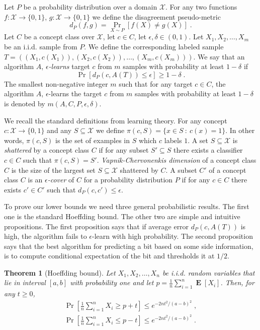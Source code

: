 \documentclass[11pt]{article}
\newtheorem{theorem}[proposition]{Theorem}
\newcommand{\X}{\mathcal{X}}
\DeclareMathOperator{\Exp}{\mathbf{E}}
\begin{document}
Let $P$ be a probability distribution over a domain $\X$. For any two functions
$f:\X \to \{0,1\}$, $g:\X \to \{0,1\}$ we define the disagreement pseudo-metric
$$
d_P(f,g) = \Pr_{X \sim P}[f(X) \neq g(X)] \; .
$$
Let $C$ be a concept class over $\X$, let $c \in C$, let $\epsilon, \delta \in (0,1)$.
Let  $X_1, X_2, \dots, X_m$ be an i.i.d. sample from $P$. We define the corresponding
labeled sample $T = ((X_1, c(X_1)), (X_2, c(X_2)), \dots, (X_m, c(X_m)))$.
We say that an algorithm $A$, \emph{$\epsilon$-learns} target $c$ from $m$ samples
with probability at least $1 - \delta$ if
$$
\Pr \left[d_P(c,A(T)) \le \epsilon \right]  \ge 1 - \delta \; .
$$
The smallest non-negative integer $m$ such that for any target $c \in C$,
the algorithm $A$, $\epsilon$-learns the target $c$ from $m$ samples
with probability at least $1-\delta$ is denoted by $m(A,C,P,\epsilon,\delta)$.

We recall the standard definitions from learning theory. For any concept $c:\X
\to \{0,1\}$ and any $S \subseteq \X$ we define $\pi(c,S) = \{x \in S ~:~ c(x) =
1 \}$. In other words, $\pi(c,S)$ is the set of examples in $S$ which $c$ labels
$1$. A set $S \subseteq \X$ is \emph{shattered} by a concept class $C$ if for
any subset $S' \subseteq S$ there exists a classifier $c \in C$ such that
$\pi(c,S) = S'$. \emph{Vapnik-Chervonenkis dimension} of a concept class $C$ is
the size of the largest set $S \subseteq \X$ shattered by $C$. A subset $C'$ of
a concept class $C$ is an \emph{$\epsilon$-cover} of $C$ for a probability
distribution $P$ if for any $c \in C$ there exists $c' \in C'$ such that
$d_P(c,c') \le \epsilon$.

To prove our lower bounds we need three general probabilistic results. The first
one is the standard Hoeffding bound. The other two are simple and intuitive
propositions. The first proposition says that if average error $d_P(c,A(T))$ is
high, the algorithm fails to $\epsilon$-learn with high probability. The second
proposition says that the best algorithm for predicting a bit based on some side
information, is to compute conditional expectation of the bit and thresholds it
at $1/2$.

\begin{theorem}[Hoeffding bound]
Let $X_1, X_2, \dots, X_n$ be i.i.d. random variables that lie in interval
$[a,b]$ with probability one and let $p=\frac{1}{n}\sum_{i=1}^n \Exp[X_i]$.
Then, for any $t \ge 0$,
\begin{align*}
\Pr \left[{\frac {1}{n}} \sum_{i=1}^n X_i \ge p + t \right] \le e^{ - 2n t^2/(a-b)^2} \; , \\
\Pr \left[{\frac {1}{n}} \sum_{i=1}^n X_i \le p - t \right] \le e^{ - 2n t^2/(a-b)^2}  \; .
\end{align*}
\end{theorem}
\end{document}
